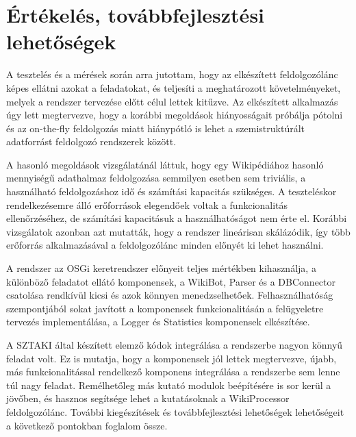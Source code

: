 \chapter{Értékelés, továbbfejlesztési lehetőségek}
\label{cha:ending}

A tesztelés és a mérések során arra jutottam, hogy az elkészített feldolgozólánc képes ellátni azokat a feladatokat, és teljesíti a meghatározott követelményeket, melyek a rendszer tervezése előtt célul lettek kitűzve. Az elkészített alkalmazás úgy lett megtervezve, hogy a korábbi megoldások hiányosságait próbálja pótolni és az on-the-fly feldolgozás miatt hiánypótló is lehet a szemistruktúrált adatforrást feldolgozó rendszerek között.

A hasonló megoldások vizsgálatánál láttuk, hogy egy Wikipédiához hasonló mennyiségű adathalmaz feldolgozása semmilyen esetben sem triviális, a használható feldolgozáshoz idő és számítási kapacitás szükséges. A teszteléskor rendelkezésemre álló erőforrások elegendőek voltak a funkcionalitás ellenőrzéséhez, de számítási kapacitásuk a használhatóságot nem érte el. Korábbi vizsgálatok azonban azt mutatták, hogy a rendszer lineárisan skálázódik, így több erőforrás alkalmazásával a feldolgozólánc minden előnyét ki lehet használni.

A rendszer az OSGi keretrendszer előnyeit teljes mértékben kihasználja, a különböző feladatot ellátó komponensek, a WikiBot, Parser és a DBConnector csatolása rendkívül kicsi és azok könnyen menedzselhetőek. Felhasználhatóság szempontjából sokat javított a komponensek funkcionalitásán a felügyeletre tervezés implementálása, a Logger és Statistics komponensek elkészítése.

A SZTAKI által készített elemző kódok integrálása a rendszerbe nagyon könnyű feladat volt. Ez is mutatja, hogy a komponensek jól lettek megtervezve, újabb, más funkcionalitással rendelkező komponens integrálása a rendszerbe sem lenne túl nagy feladat. Remélhetőleg más kutató modulok beépítésére is sor kerül a jövőben, és hasznos segítsége lehet a kutatásoknak a WikiProcessor feldolgozólánc. További kiegészítések és továbbfejlesztési lehetőségek lehetőségeit a következő pontokban foglalom össze.

